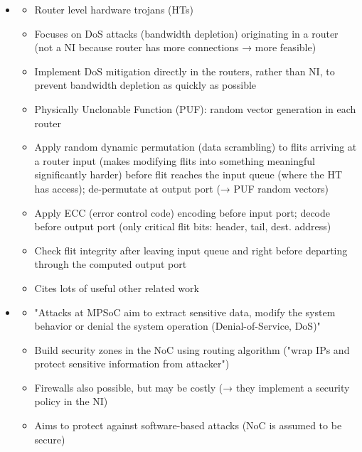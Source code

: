 \documentclass[
	paper=a4,
	fontsize=11pt,
	parskip=full %
]{scrreprt}
\begin{document}
\begin{itemize}
\begin{itemize}
            \end{itemize}
        \item \textbf{}
            \begin{itemize}
                \item Router level hardware trojans (HTs)
                \item Focuses on DoS attacks (bandwidth depletion) originating in a router (not a NI because router has more connections → more
                    feasible)
                \item Implement DoS mitigation directly in the routers, rather than NI, to prevent bandwidth depletion as quickly as possible
                \item Physically Unclonable Function (PUF): random vector generation in each router
                \item Apply random dynamic permutation (data scrambling) to flits arriving at a router input (makes modifying flits into something
                    meaningful significantly harder) before flit reaches the input queue (where the HT has access); de-permutate at output port (→
                    PUF random vectors)
                \item Apply ECC (error control code) encoding before input port; decode before output port (only critical flit bits: header, tail,
                    dest. address)
                \item Check flit integrity after leaving input queue and right before departing through the computed output port
                \item Cites lots of useful other related work
            \end{itemize}
        \item \textbf{}
            \begin{itemize}
                \item "Attacks at MPSoC aim to extract sensitive data, modify the system behavior or denial the system operation (Denial-of-Service,
                    DoS)"
                \item Build security zones in the NoC using routing algorithm ("wrap IPs and protect sensitive information from attacker")
                \item Firewalls also possible, but may be costly (→ they implement a security policy in the NI)
                \item Aims to protect against software-based attacks (NoC is assumed to be secure)

\end{itemize}
\end{itemize}
\end{document}
